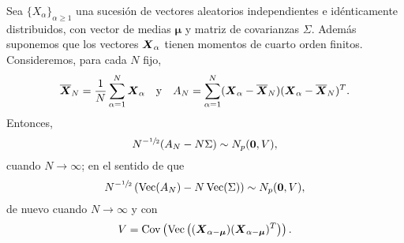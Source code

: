 \begin{nprop}
  Sea \(\{X_{\alpha}\}_{\alpha \geq 1}\) una sucesión de vectores aleatorios independientes e idénticamente distribuidos, con vector de medias \(\boldsymbol \mu\) y matriz de covarianzas \(\Sigma\).
  Además suponemos que los vectores \(\boldsymbol{X}_{\alpha}\) tienen momentos de cuarto orden finitos.
  Consideremos, para cada \(N\) fijo,
  \[
    \overline{\boldsymbol{X}}_N = \frac{1}{N}\sum_{\alpha = 1}^N \boldsymbol{X}_{\alpha}
    \quad
    \text{y}
    \quad
    A_N = \sum_{\alpha = 1}^N (\boldsymbol{X}_{\alpha} - \overline{\boldsymbol{X}}_N)(\boldsymbol{X}_{\alpha} - \overline{\boldsymbol{X}}_N)^T.
  \]
  Entonces, \[
    N^{-\sfrac{1}{2}}(A_N - N\Sigma) \sim N_p(\boldsymbol 0, V),
  \] cuando \(N \to \infty\); en el sentido de que \[
    N^{-\sfrac{1}{2}}\left(\operatorname{Vec}(A_N) - N\operatorname{Vec}(\Sigma)\right) \sim N_p(\boldsymbol 0, V),
  \] de nuevo cuando \(N \to \infty\) y con \[
    V = \operatorname{Cov}\left(\operatorname{Vec}\left((\boldsymbol{X}_{\alpha - \boldsymbol \mu})(\boldsymbol{X}_{\alpha - \boldsymbol \mu})^T\right)\right).
  \]
\end{nprop}

